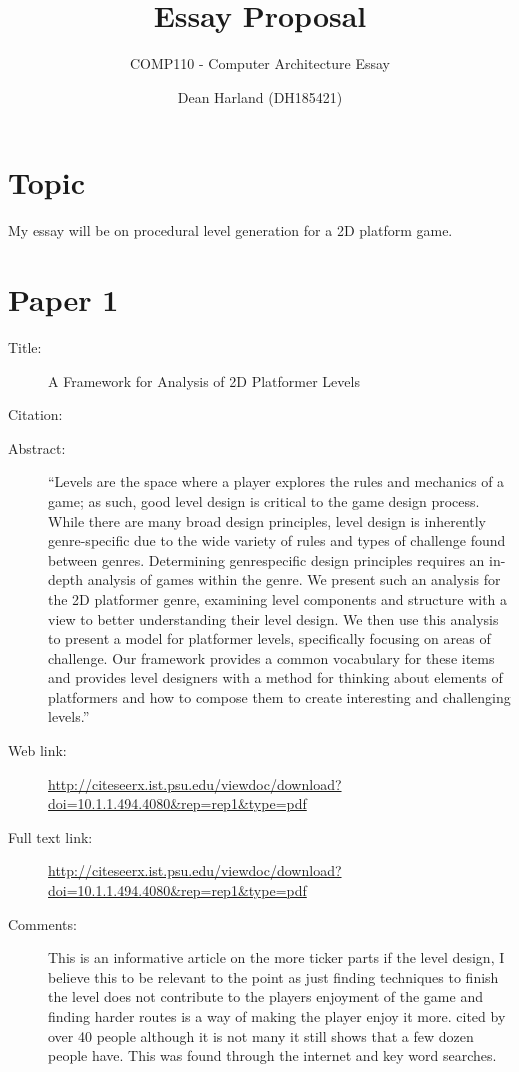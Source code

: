 \documentclass{scrartcl}
\title{Essay Proposal}
\subtitle{COMP110 - Computer Architecture Essay}
\author{Dean Harland (DH185421)}
\begin{document}
	
	\maketitle
	
	\section*{Topic}
	
	My essay will be on procedural level generation for a 2D platform game.
	
	
	\section*{Paper 1}
	\begin{description}
		\item[Title:] A Framework for Analysis of 2D Platformer Levels
		\item[Citation:] \cite{tricky}
		\item[Abstract:] ``Levels are the space where a player explores the rules and mechanics
		of a game; as such, good level design is critical to the game design
		process. While there are many broad design principles, level
		design is inherently genre-specific due to the wide variety of rules
		and types of challenge found between genres. Determining genrespecific
		design principles requires an in-depth analysis of games
		within the genre. We present such an analysis for the 2D platformer
		genre, examining level components and structure with a view to
		better understanding their level design. We then use this analysis
		to present a model for platformer levels, specifically focusing on
		areas of challenge. Our framework provides a common vocabulary
		for these items and provides level designers with a method for
		thinking about elements of platformers and how to compose them
		to create interesting and challenging levels.''
		\item[Web link:] \url{http://citeseerx.ist.psu.edu/viewdoc/download?doi=10.1.1.494.4080&rep=rep1&type=pdf}
		\item[Full text link:] \url{http://citeseerx.ist.psu.edu/viewdoc/download?doi=10.1.1.494.4080&rep=rep1&type=pdf}
		\item[Comments:] This is an informative article on the more ticker parts if the level design, I believe this to be relevant to the point as just finding techniques to finish the level does not contribute to the players enjoyment of the game and finding harder routes is a way of making the player enjoy it more. cited by over 40 people although it is not many it still shows that a few dozen people have. This was found through the internet and key word searches.
	\end{description}
	
\end{document}
